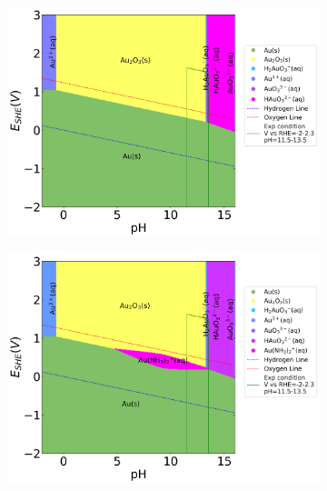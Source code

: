 \documentclass[journal=jacsat,manuscript=article]{achemso}
\begin{document}
\begin{figure}[htbp]
    \centering
    \begin{subfigure}[b]{0.3\textwidth}
        \subcaption{}\label{fig:Au_Pourbaix_H2O}
        \includegraphics[width=\textwidth]{Figures/pourbaix_diagrams/Au-NH3-H2O_activity=1e-04_[NH3]=0M_[Gly]=0M_[CN]=0.png}
        \par\medskip
    \end{subfigure}
    \begin{subfigure}[b]{0.3\textwidth}
        \subcaption{}\label{fig:Au_Pourbaix_NH3_Gly}
        \includegraphics[width=\textwidth]{Figures/pourbaix_diagrams/Au-NH3-H2O_activity=1e-04_[NH3]=0.02M_[Gly]=0.005M_[CN]=0.png}

\end{subfigure}
\end{figure}
\end{document}
